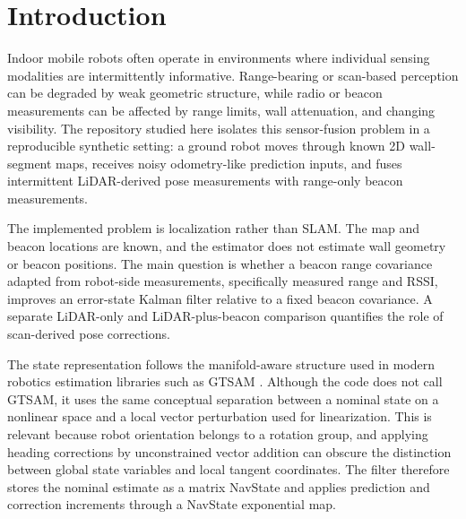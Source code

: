 \section{Introduction}

Indoor mobile robots often operate in environments where individual sensing modalities are intermittently informative. Range-bearing or scan-based perception can be degraded by weak geometric structure, while radio or beacon measurements can be affected by range limits, wall attenuation, and changing visibility. The repository studied here isolates this sensor-fusion problem in a reproducible synthetic setting: a ground robot moves through known 2D wall-segment maps, receives noisy odometry-like prediction inputs, and fuses intermittent LiDAR-derived pose measurements with range-only beacon measurements.

The implemented problem is localization rather than SLAM. The map and beacon locations are known, and the estimator does not estimate wall geometry or beacon positions. The main question is whether a beacon range covariance adapted from robot-side measurements, specifically measured range and RSSI, improves an error-state Kalman filter relative to a fixed beacon covariance. A separate LiDAR-only and LiDAR-plus-beacon comparison quantifies the role of scan-derived pose corrections.

The state representation follows the manifold-aware structure used in modern robotics estimation libraries such as GTSAM \citep{dellaert2022gtsam,gtsamConcepts,dellaert2012gtsam,dellaertKaess2017factor}. Although the code does not call GTSAM, it uses the same conceptual separation between a nominal state on a nonlinear space and a local vector perturbation used for linearization. This is relevant because robot orientation belongs to a rotation group, and applying heading corrections by unconstrained vector addition can obscure the distinction between global state variables and local tangent coordinates. The filter therefore stores the nominal estimate as a matrix NavState and applies prediction and correction increments through a NavState exponential map.
